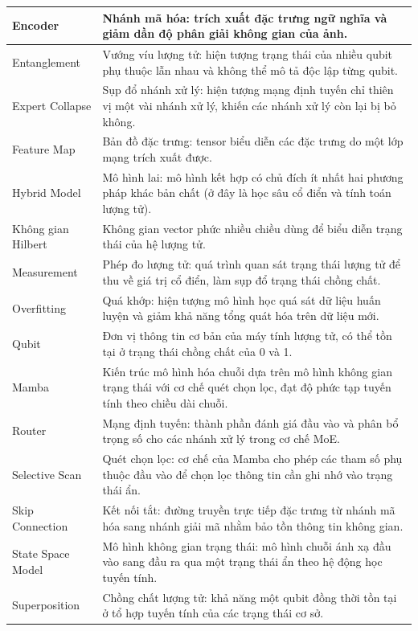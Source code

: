 \begin{center}
\begin{longtable}{|p{3.6cm}|p{11.4cm}|}
Encoder & Nhánh mã hóa: trích xuất đặc trưng ngữ nghĩa và giảm dần độ phân giải không gian của ảnh. \\ \hline
Entanglement & Vướng víu lượng tử: hiện tượng trạng thái của nhiều qubit phụ thuộc lẫn nhau và không thể mô tả độc lập từng qubit. \\ \hline
Expert Collapse & Sụp đổ nhánh xử lý: hiện tượng mạng định tuyến chỉ thiên vị một vài nhánh xử lý, khiến các nhánh xử lý còn lại bị bỏ không. \\ \hline
Feature Map & Bản đồ đặc trưng: tensor biểu diễn các đặc trưng do một lớp mạng trích xuất được. \\ \hline
Hybrid Model & Mô hình lai: mô hình kết hợp có chủ đích ít nhất hai phương pháp khác bản chất (ở đây là học sâu cổ điển và tính toán lượng tử). \\ \hline
Không gian Hilbert & Không gian vector phức nhiều chiều dùng để biểu diễn trạng thái của hệ lượng tử. \\ \hline
Measurement & Phép đo lượng tử: quá trình quan sát trạng thái lượng tử để thu về giá trị cổ điển, làm sụp đổ trạng thái chồng chất. \\ \hline
Overfitting & Quá khớp: hiện tượng mô hình học quá sát dữ liệu huấn luyện và giảm khả năng tổng quát hóa trên dữ liệu mới. \\ \hline
Qubit & Đơn vị thông tin cơ bản của máy tính lượng tử, có thể tồn tại ở trạng thái chồng chất của 0 và 1. \\ \hline
Mamba & Kiến trúc mô hình hóa chuỗi dựa trên mô hình không gian trạng thái với cơ chế quét chọn lọc, đạt độ phức tạp tuyến tính theo chiều dài chuỗi. \\ \hline
Router & Mạng định tuyến: thành phần đánh giá đầu vào và phân bổ trọng số cho các nhánh xử lý trong cơ chế MoE. \\ \hline
Selective Scan & Quét chọn lọc: cơ chế của Mamba cho phép các tham số phụ thuộc đầu vào để chọn lọc thông tin cần ghi nhớ vào trạng thái ẩn. \\ \hline
Skip Connection & Kết nối tắt: đường truyền trực tiếp đặc trưng từ nhánh mã hóa sang nhánh giải mã nhằm bảo tồn thông tin không gian. \\ \hline
State Space Model & Mô hình không gian trạng thái: mô hình chuỗi ánh xạ đầu vào sang đầu ra qua một trạng thái ẩn theo hệ động học tuyến tính. \\ \hline
Superposition & Chồng chất lượng tử: khả năng một qubit đồng thời tồn tại ở tổ hợp tuyến tính của các trạng thái cơ sở. \\ \hline

\end{longtable}
\end{center}

\renewcommand{\thetable}{\thechapter.\arabic{table}}
\setcounter{table}{0}
